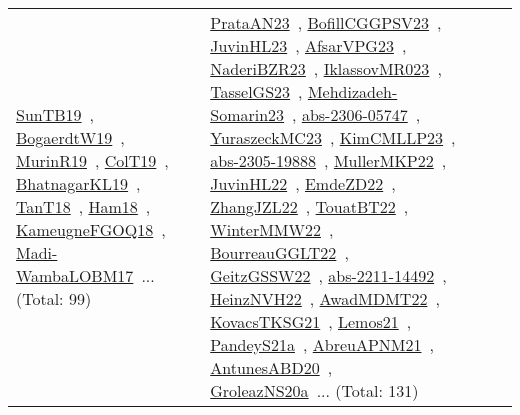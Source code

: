 {\begin{longtable}{lp{3cm}>{\raggedright\arraybackslash}p{6cm}>{\raggedright\arraybackslash}p{6cm}>{\raggedright\arraybackslash}p{8cm}}
\href{../works/SunTB19.pdf}{SunTB19}~\cite{SunTB19}, \href{../works/BogaerdtW19.pdf}{BogaerdtW19}~\cite{BogaerdtW19}, \href{../works/MurinR19.pdf}{MurinR19}~\cite{MurinR19}, \href{../works/ColT19.pdf}{ColT19}~\cite{ColT19}, \href{../works/BhatnagarKL19.pdf}{BhatnagarKL19}~\cite{BhatnagarKL19}, \href{../works/TanT18.pdf}{TanT18}~\cite{TanT18}, \href{../works/Ham18.pdf}{Ham18}~\cite{Ham18}, \href{../works/KameugneFGOQ18.pdf}{KameugneFGOQ18}~\cite{KameugneFGOQ18}, \href{../works/Madi-WambaLOBM17.pdf}{Madi-WambaLOBM17}~\cite{Madi-WambaLOBM17}... (Total: 99) & \href{../works/PrataAN23.pdf}{PrataAN23}~\cite{PrataAN23}, \href{../works/BofillCGGPSV23.pdf}{BofillCGGPSV23}~\cite{BofillCGGPSV23}, \href{../works/JuvinHL23.pdf}{JuvinHL23}~\cite{JuvinHL23}, \href{../works/AfsarVPG23.pdf}{AfsarVPG23}~\cite{AfsarVPG23}, \href{../works/NaderiBZR23.pdf}{NaderiBZR23}~\cite{NaderiBZR23}, \href{../works/IklassovMR023.pdf}{IklassovMR023}~\cite{IklassovMR023}, \href{../works/TasselGS23.pdf}{TasselGS23}~\cite{TasselGS23}, \href{../works/Mehdizadeh-Somarin23.pdf}{Mehdizadeh-Somarin23}~\cite{Mehdizadeh-Somarin23}, \href{../works/abs-2306-05747.pdf}{abs-2306-05747}~\cite{abs-2306-05747}, \href{../works/YuraszeckMC23.pdf}{YuraszeckMC23}~\cite{YuraszeckMC23}, \href{../works/KimCMLLP23.pdf}{KimCMLLP23}~\cite{KimCMLLP23}, \href{../works/abs-2305-19888.pdf}{abs-2305-19888}~\cite{abs-2305-19888}, \href{../works/MullerMKP22.pdf}{MullerMKP22}~\cite{MullerMKP22}, \href{../works/JuvinHL22.pdf}{JuvinHL22}~\cite{JuvinHL22}, \href{../works/EmdeZD22.pdf}{EmdeZD22}~\cite{EmdeZD22}, \href{../works/ZhangJZL22.pdf}{ZhangJZL22}~\cite{ZhangJZL22}, \href{../works/TouatBT22.pdf}{TouatBT22}~\cite{TouatBT22}, \href{../works/WinterMMW22.pdf}{WinterMMW22}~\cite{WinterMMW22}, \href{../works/BourreauGGLT22.pdf}{BourreauGGLT22}~\cite{BourreauGGLT22}, \href{../works/GeitzGSSW22.pdf}{GeitzGSSW22}~\cite{GeitzGSSW22}, \href{../works/abs-2211-14492.pdf}{abs-2211-14492}~\cite{abs-2211-14492}, \href{../works/HeinzNVH22.pdf}{HeinzNVH22}~\cite{HeinzNVH22}, \href{../works/AwadMDMT22.pdf}{AwadMDMT22}~\cite{AwadMDMT22}, \href{../works/KovacsTKSG21.pdf}{KovacsTKSG21}~\cite{KovacsTKSG21}, \href{../works/Lemos21.pdf}{Lemos21}~\cite{Lemos21}, \href{../works/PandeyS21a.pdf}{PandeyS21a}~\cite{PandeyS21a}, \href{../works/AbreuAPNM21.pdf}{AbreuAPNM21}~\cite{AbreuAPNM21}, \href{../works/AntunesABD20.pdf}{AntunesABD20}~\cite{AntunesABD20}, \href{../works/GroleazNS20a.pdf}{GroleazNS20a}~\cite{GroleazNS20a}... (Total: 131)\\

\end{longtable}}
